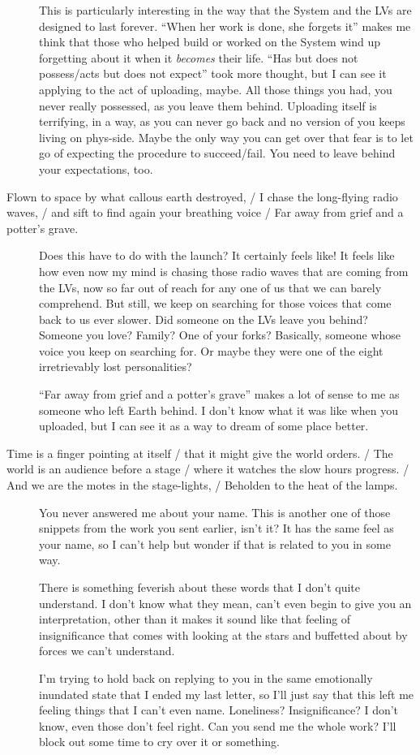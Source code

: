 \begin{description}
This is particularly interesting in the way that the System and the LVs are designed to last forever. ``When her work is done, she forgets it'' makes me think that those who helped build or worked on the System wind up forgetting about it when it \emph{becomes} their life. ``Has but does not possess/acts but does not expect'' took more thought, but I can see it applying to the act of uploading, maybe. All those things you had, you never really possessed, as you leave them behind. Uploading itself is terrifying, in a way, as you can never go back and no version of you keeps living on phys-side. Maybe the only way you can get over that fear is to let go of expecting the procedure to succeed/fail. You need to leave behind your expectations, too.
\item[Flown to space by what callous earth destroyed, / I chase the long-flying radio waves, / and sift to find again your breathing voice / Far away from grief and a potter's grave.]
Does this have to do with the launch? It certainly feels like! It feels like how even now my mind is chasing those radio waves that are coming from the LVs, now so far out of reach for any one of us that we can barely comprehend. But still, we keep on searching for those voices that come back to us ever slower. Did someone on the LVs leave you behind? Someone you love? Family? One of your forks? Basically, someone whose voice you keep on searching for. Or maybe they were one of the eight irretrievably lost personalities?

``Far away from grief and a potter's grave'' makes a lot of sense to me as someone who left Earth behind. I don't know what it was like when you uploaded, but I can see it as a way to dream of some place better.
\item[Time is a finger pointing at itself / that it might give the world orders. / The world is an audience before a stage / where it watches the slow hours progress. / And we are the motes in the stage-lights, / Beholden to the heat of the lamps.]
You never answered me about your name. This is another one of those snippets from the work you sent earlier, isn't it? It has the same feel as your name, so I can't help but wonder if that is related to you in some way.

There is something feverish about these words that I don't quite understand. I don't know what they mean, can't even begin to give you an interpretation, other than it makes it sound like that feeling of insignificance that comes with looking at the stars and buffetted about by forces we can't understand.

I'm trying to hold back on replying to you in the same emotionally inundated state that I ended my last letter, so I'll just say that this left me feeling things that I can't even name. Loneliness? Insignificance? I don't know, even those don't feel right. Can you send me the whole work? I'll block out some time to cry over it or something.
\end{description}

